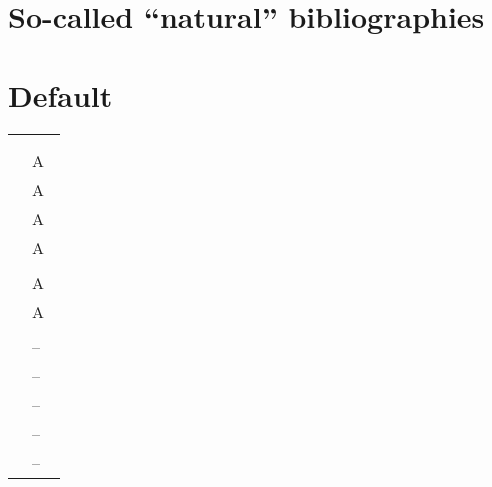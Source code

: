 \documentclass{article}
\begin{document}

\section*{So-called ``natural''  bibliographies}
\newcommand{\zyva}
{\begin{center}
\begin{tabular}{p{.4\linewidth}@{\quad\ensuremath{\Rightarrow}\quad}p{.4\linewidth}}
\url+\citet{MPW92}+ & \citet{MPW92}\\
\url+\citet[chap.~2]{MPW92}+ & \citet[chap.~2]{MPW92}\\
\url+\citep{MPW92}+ & A~\citep{MPW92}\\
\url+\citep[chap.~2]{MPW92}+ & A~\citep[chap.~2]{MPW92}\\
\url+\citep[see][]{MPW92}+ & A~\citep[see][]{MPW92}\\
\url+\citep[see][chap.~2]{MPW92}+ & A~\citep[see][chap.~2]{MPW92}\\
\url+\citet*{MPW92}+ & \citet*{MPW92}\\
\url+\citep*{MPW92}+ & A~\citep*{MPW92}\\
\url+\citep[chap.~2]{MPW92,odersky:esop2000}+ & A~\citep[chap.~2]{MPW92,odersky:esop2000} \\
\url+\citet[chap.~2]{MPW92,odersky:esop2000}+ &\citet[chap.~2]{MPW92,odersky:esop2000} \\
\url+\citenum{MPW92}--\citenum{MPW92,odersky:esop2000}+ &
\citenum{MPW92}--\citenum{MPW92,odersky:esop2000}\\
\url+\citeauthor{MPW92}--\citeauthor{MPW92,odersky:esop2000}+ &
\citeauthor{MPW92}--\citeauthor{MPW92,odersky:esop2000}\\
\url+\citeauthor*{MPW92}--\citeauthor*{MPW92,odersky:esop2000}+ &
\citeauthor*{MPW92}--\citeauthor*{MPW92,odersky:esop2000}\\
\url+\citeyear{MPW92}--\citeyear{MPW92,odersky:esop2000}+ &
\citeyear{MPW92}--\citeyear{MPW92,odersky:esop2000}\\
\url+\citeyearpar{MPW92}--\citeyearpar{MPW92,odersky:esop2000}+ &
\citeyearpar{MPW92}--\citeyearpar{MPW92,odersky:esop2000}\\
\end{tabular}
\end{center}}

\section*{Default}
\zyva
\end{document}
